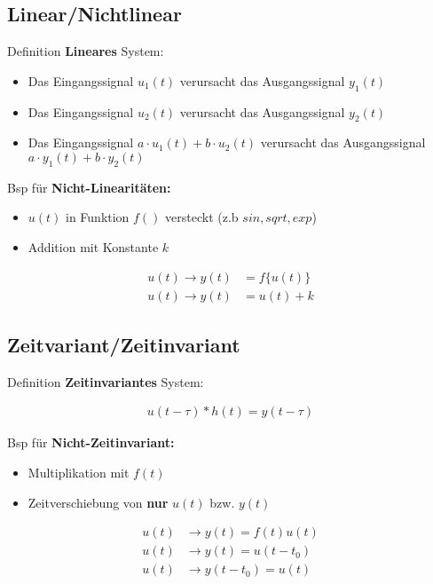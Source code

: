 \documentclass[10pt,a4paper]{article}
\begin{document}
  \subsection{Linear/Nichtlinear}
  Definition \textbf{Lineares} System:
  \begin{itemize}
      \item Das Eingangssignal $u_1(t)$ verursacht das Ausgangssignal $y_1(t)$
      \item Das Eingangssignal $u_2(t)$ verursacht das Ausgangssignal $y_2(t)$
      \item Das Eingangssignal $a\cdot u_1(t) + b\cdot u_2(t)$ verursacht das Ausgangssignal $a\cdot y_1(t) + b\cdot y_2(t)$
  \end{itemize}
  Bsp für \textbf{Nicht-Linearitäten:}
  \begin{itemize}
      \item $u(t)$ in Funktion $f()$ versteckt (z.b $sin, sqrt, exp$)
      \item Addition mit Konstante $k$
  \end{itemize}
  
  \begin{mdframed}[style=exercise]
    \begin{align}
        u(t)\rightarrow y(t) &= f\{u(t)\} \\
        u(t)\rightarrow y(t) &= u(t) + k
    \end{align}
  \end{mdframed}

  \subsection{Zeitvariant/Zeitinvariant}
  Definition \textbf{Zeitinvariantes} System:
  \begin{mdframed}[style=exercise]
    \begin{align}
        u(t-\tau) * h(t) = y(t-\tau)
    \end{align}
  \end{mdframed}
  Bsp für \textbf{Nicht-Zeitinvariant:}
  \begin{itemize}
    \item Multiplikation mit $f(t)$
    \item Zeitverschiebung von \textbf{nur} $u(t)$ bzw. $y(t)$
  \end{itemize}
  \begin{mdframed}[style=exercise]
    \begin{align}
        u(t) &\rightarrow y(t) = f(t)u(t)\\
        u(t) &\rightarrow y(t) = u(t-t_0)\\
        u(t) &\rightarrow y(t-t_0) = u(t)
    \end{align}
  \end{mdframed}
\end{document}

